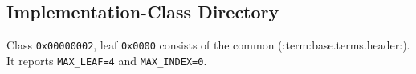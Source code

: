 \subsection{Implementation-Class Directory}
Class \texttt{0x00000002}, leaf \texttt{0x0000} consists of the common (:term:base.terms.header:). It reports
\texttt{MAX\_LEAF=4} and \texttt{MAX\_INDEX=0}.

